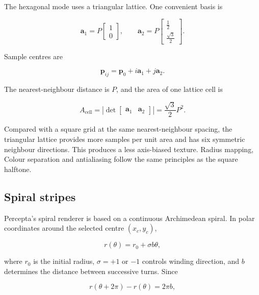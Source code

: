 The hexagonal mode uses a triangular lattice. One convenient basis is

\begin{equation}
\mathbf{a}_1=P\begin{bmatrix}1\\0\end{bmatrix},
\qquad
\mathbf{a}_2=P\begin{bmatrix}\frac{1}{2}\\[1mm]\frac{\sqrt{3}}{2}\end{bmatrix}.
\label{eq:hexbasis}
\end{equation}

Sample centres are

\begin{equation}
\mathbf{p}_{ij}=\mathbf{p}_0+i\mathbf{a}_1+j\mathbf{a}_2.
\label{eq:hexgrid}
\end{equation}

The nearest-neighbour distance is $P$, and the area of one lattice cell is

\begin{equation}
A_{\mathrm{cell}}=
\left|\det\begin{bmatrix}\mathbf{a}_1&\mathbf{a}_2\end{bmatrix}\right|
=\frac{\sqrt{3}}{2}P^2.
\label{eq:hexarea}
\end{equation}

Compared with a square grid at the same nearest-neighbour spacing, the triangular lattice provides more samples per unit area and has six symmetric neighbour directions. This produces a less axis-biased texture. Radius mapping, Colour separation and antialiasing follow the same principles as the square halftone.

\subsection{Spiral stripes}

Percepta's spiral renderer is based on a continuous Archimedean spiral. In polar coordinates around the selected centre $(x_c,y_c)$,

\begin{equation}
r(\theta)=r_0+\sigma b\theta,
\label{eq:archimedean}
\end{equation}

where $r_0$ is the initial radius, $\sigma=+1$ or $-1$ controls winding direction, and $b$ determines the distance between successive turns. Since

\begin{equation}
r(\theta+2\pi)-r(\theta)=2\pi b,
\end{equation}

